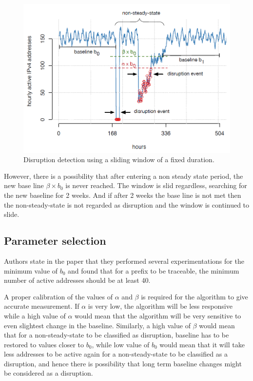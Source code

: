 \documentclass[11pt,twoside,a4paper]{article}
\begin{document}
\begin{figure}[h!] 
\centering
  \includegraphics[width=0.6\linewidth]{2.png}
  \caption{Disruption detection using a sliding window of a fixed duration.}
  \label{fig:DisruptionDec}
\end{figure}

However, there is a possibility that after entering a non steady state period, the new base line $\beta \times b_0$ is never reached. The window is slid regardless, searching for the new baseline for 2 weeks. And if after 2 weeks the base line is not met then the non-steady-state is not regarded as disruption and the window is continued to slide.

\subsection{Parameter selection}
Authors state in the paper that they performed several experimentations for the minimum value of $b_0$ and found that for a prefix to be traceable, the minimum number of active addresses should be at least 40.

A proper calibration of the values of $\alpha$ and $\beta$ is required for the algorithm to give accurate measurement. If $\alpha$ is very low, the algorithm will be less responsive while a high value of $\alpha$ would mean that the algorithm will be very sensitive to even slightest change in the baseline. Similarly, a high value of $\beta$ would mean that for a non-steady-state to be classified as disruption, baseline has to be restored to values closer to $b_0$, while low value of $b_0$ would mean that it will take less addresses to be active again for a non-steady-state to be classified as a disruption, and hence there is possibility that long term baseline changes might be considered as a disruption.
\end{document}
